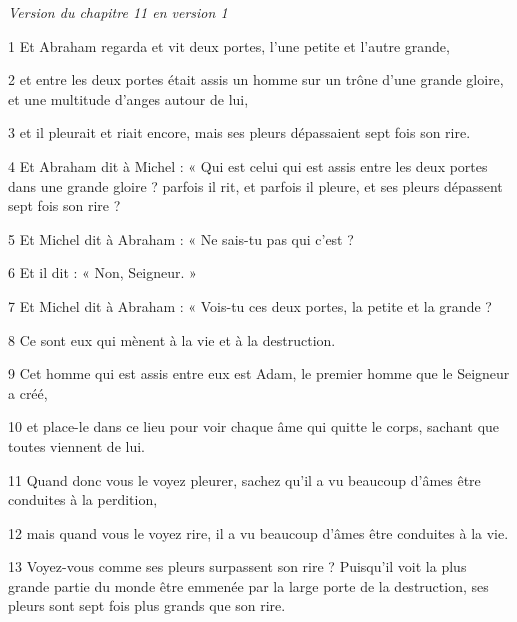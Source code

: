 
\par \textit{Version du chapitre 11 en version 1}

\par 1 Et Abraham regarda et vit deux portes, l'une petite et l'autre grande,

\par 2 et entre les deux portes était assis un homme sur un trône d'une grande gloire, et une multitude d'anges autour de lui,

\par 3 et il pleurait et riait encore, mais ses pleurs dépassaient sept fois son rire.

\par 4 Et Abraham dit à Michel : « Qui est celui qui est assis entre les deux portes dans une grande gloire ? parfois il rit, et parfois il pleure, et ses pleurs dépassent sept fois son rire ?

\par 5 Et Michel dit à Abraham : « Ne sais-tu pas qui c'est ?

\par 6 Et il dit : « Non, Seigneur. »

\par 7 Et Michel dit à Abraham : « Vois-tu ces deux portes, la petite et la grande ?

\par 8 Ce sont eux qui mènent à la vie et à la destruction.

\par 9 Cet homme qui est assis entre eux est Adam, le premier homme que le Seigneur a créé,

\par 10 et place-le dans ce lieu pour voir chaque âme qui quitte le corps, sachant que toutes viennent de lui.

\par 11 Quand donc vous le voyez pleurer, sachez qu'il a vu beaucoup d'âmes être conduites à la perdition,

\par 12 mais quand vous le voyez rire, il a vu beaucoup d'âmes être conduites à la vie.

\par 13 Voyez-vous comme ses pleurs surpassent son rire ? Puisqu’il voit la plus grande partie du monde être emmenée par la large porte de la destruction, ses pleurs sont sept fois plus grands que son rire.


